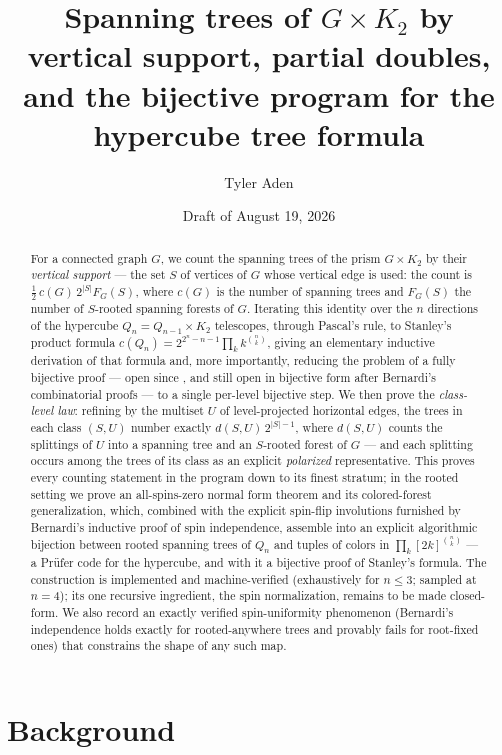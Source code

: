 \documentclass[11pt]{amsart}
\title[Vertical supports and the hypercube tree formula]{Spanning trees of
$G\times K_2$ by vertical support, partial doubles,\\ and the bijective
program for the hypercube tree formula}
\author{Tyler Aden}
\date{Draft of August 19, 2026}
\theoremstyle{definition}
\begin{document}
\maketitle

\begin{abstract}
For a connected graph $G$, we count the spanning trees of the prism
$G\times K_2$ by their \emph{vertical support} --- the set $S$ of vertices
of $G$ whose vertical edge is used: the count is
$\tfrac12\,c(G)\,2^{|S|}F_G(S)$, where $c(G)$ is the number of spanning
trees and $F_G(S)$ the number of $S$-rooted spanning forests of $G$.
Iterating this identity over the $n$ directions of the hypercube
$Q_n = Q_{n-1}\times K_2$ telescopes, through Pascal's rule, to Stanley's
product formula $c(Q_n)=2^{2^n-n-1}\prod_k k^{\binom nk}$, giving an
elementary inductive derivation of that formula and, more importantly,
reducing the problem of a fully bijective proof --- open since
\cite[Example~5.6.10]{ec2}, and still open in bijective form after
Bernardi's combinatorial proofs \cite{bernardi} --- to a single per-level
bijective step. We then prove the \emph{class-level law}: refining by the
multiset $U$ of level-projected horizontal edges, the trees in each class
$(S,U)$ number exactly $d(S,U)\,2^{|S|-1}$, where $d(S,U)$ counts the
splittings of $U$ into a spanning tree and an $S$-rooted forest of $G$ ---
and each splitting occurs among the trees of its class as an explicit
\emph{polarized} representative. This proves every counting statement in
the program down to its finest stratum; in the rooted setting we prove an all-spins-zero
normal form theorem and its colored-forest generalization, which, combined
with the explicit spin-flip involutions furnished by Bernardi's inductive
proof of spin independence, assemble into an explicit algorithmic bijection
between rooted spanning trees of $Q_n$ and tuples of colors in
$\prod_k [2k]^{\binom nk}$ --- a Pr\"ufer code for the hypercube, and with
it a bijective proof of Stanley's formula. The construction is implemented
and machine-verified (exhaustively for $n \le 3$; sampled at $n = 4$); its
one recursive ingredient, the spin normalization, remains to be made
closed-form. We also
record an exactly verified spin-uniformity phenomenon (Bernardi's
independence holds exactly for rooted-anywhere trees and provably fails
for root-fixed ones) that constrains the shape of any such map.
\end{abstract}

\section{Background}
\end{document}
